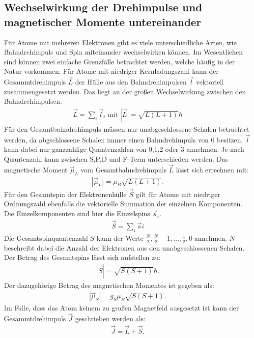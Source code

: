\subsection{Wechselwirkung der Drehimpulse und magnetischer Momente untereinander}
Für Atome mit mehreren Elektronen gibt es viele unterschiedliche Arten, wie Bahndrehimpuls und Spin miteinander wechselwirken können.
Im Wesentlichen sind können zwei einfache Grenzfälle betrachtet werden, welche häufig in der Natur vorkommen.
%
Für Atome mit niedriger Kernladungszahl kann der Gesammtdrehimpuls $\vec{L}$ der Hülle aus den Bahndrehimpulsen $\vec{l}$ vektoriell zusammengesetzt werden.
Das liegt an der großen Wechselwirkung zwischen den Bahndrehimpulsen.
\begin{align*}
  \vec{L} = \sum_i{\vec{l}_i} \text{ mit } |\vec{L}|= \sqrt{L(L+1)}\hbar
\end{align*}
Für den Gesamtbahndrehimpuls müssen nur unabgeschlossene Schalen betrachtet werden, da abgschlossene Schalen immer einen Bahndrehimpuls von 0 besitzen.
$\vec{l}$ kann dabei nur ganzzahlige Quantenzahlen von 0,1,2 oder 3 annehmen.
Je nach Quantenzahl kann zwischen S,P,D und F-Term unterschieden werden.
Das magnetische Moment $\vec{\mu}_L$ vom Gesamtbahndrehimpuls $\vec{L}$ lässt sich errechnen mit:
\begin{align*}
  |\vec{\mu}_L| = \mu_B\sqrt{L(L+1)}.
\end{align*}
%
Für den Gesamtspin der Elektronenhülle $\vec{S}$ gilt für Atome mit niedriger Ordnungszahl ebenfalls die vektorielle Summation der einzelnen Komponenten.
Die Einzelkomponenten sind hier die Einzelspins $\vec{s}_i$.
\begin{align*}
  \vec{S} = \sum_{i}{\vec{s}i}
\end{align*}
Die Gesamtspinquantenzahl $S$ kann der Werte $\frac{N}{2}, \frac{N}{2}-1, ..., \frac{1}{2},0$ annehmen.
$N$ beschreibt dabei die Anzahl der Elektronen aus den unabgeschlossenen Schalen.
Der Betrag des Gesamtspins lässt sich aufstellen zu:
\begin{align*}
  |\vec{S}| = \sqrt{S(S+1)}\hbar.
\end{align*}
Der dazugehörige Betrag des magnetischen Momentes ist gegeben als:
\begin{align*}
  |\vec{\mu}_S| = g_S\mu_B\sqrt{S(S+1)}.
\end{align*}
Im Falle, dass das Atom keinem zu großen Magnetfeld ausgesetzt ist kann der Gesammtdrehimpuls $\vec{J}$ geschrieben werden als:
\begin{align*}
  \vec{J} = \vec{L}+ \vec{S}.
\end{align*}
